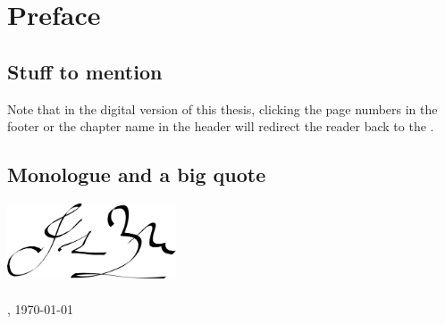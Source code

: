 \chapter*{Preface}


\section*{Stuff to mention}
Note that in the digital version of this thesis, clicking the page numbers in the footer or the chapter name in the header will redirect the reader back to the \contentsname.


\section*{Monologue and a big quote}
\lipsum[7]


\noindent
\lipsum[11]


\begin{flushright}
    \vspace*{20 mm}
    \noindent
    \includegraphics[width=5cm]{Graphics/Signature.pdf}\\
    \DocumentAuthor\\
    \DocumentUniversityCity, \today
\end{flushright}
